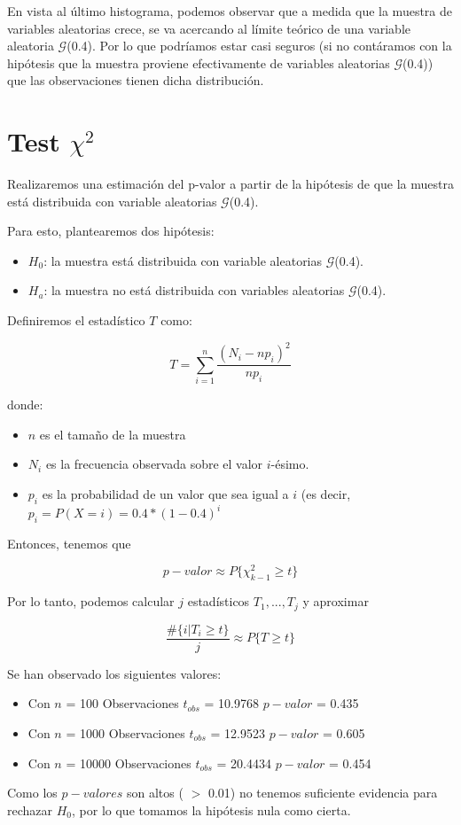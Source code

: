 \documentclass[a4paper,10pt]{article}
\begin{document}
En vista al último histograma, podemos observar que a medida que la muestra de variables aleatorias
crece, se va acercando al límite teórico de una variable aleatoria $\mathcal{G}$(0.4).
Por lo que podríamos estar casi seguros (si no contáramos con la hipótesis que la muestra proviene
efectivamente de variables aleatorias $\mathcal{G}$(0.4)) que las observaciones tienen
dicha distribución.

\pagebreak

\section*{Test $\chi^2$}

\vspace{0.4in}

Realizaremos una estimación del p-valor a partir de la hipótesis de que la muestra está distribuida
con variable aleatorias $\mathcal{G}$(0.4).

Para esto, plantearemos dos hipótesis:

\begin{itemize}
 \item $H_0$: la muestra está distribuida con variable aleatorias $\mathcal{G}$(0.4).
 \item $H_a$: la muestra no está distribuida con variables aleatorias $\mathcal{G}$(0.4).
\end{itemize}

Definiremos el estadístico $T$ como:

\[T = \sum\limits_{i=1}^n \frac{(N_i - n p_i)^2}{n p_i}\]

donde:

\begin{itemize}
 \item $n$ es el tamaño de la muestra
 \item $N_i$ es la frecuencia observada sobre el valor $i$-ésimo.
 \item $p_i$ es la probabilidad de un valor que sea igual a $i$ (es decir, $p_i = P(X=i) = 0.4*(1 - 0.4)^i$
\end{itemize}

Entonces, tenemos que

\[p-valor \approx P\{\chi^2_{k-1} \geq t\}\]

Por lo tanto, podemos calcular $j$ estadísticos $T_1,...,T_j$
y aproximar

\[\frac{\#\{i | T_i \geq t\}}{j} \approx P\{T \geq t\}\]

Se han observado los siguientes valores:

\begin{itemize}
 \item Con $n$ = 100 Observaciones
 \subitem $t_{obs}$ = 10.9768
 \subitem $p-valor$ = 0.435
 \item Con $n$ = 1000 Observaciones
 \subitem $t_{obs}$ = 12.9523
 \subitem $p-valor$ = 0.605
 \item Con $n$ = 10000 Observaciones
 \subitem $t_{obs}$ = 20.4434
 \subitem $p-valor$ = 0.454
\end{itemize}

Como los $p-valores$ son altos ( $>$ 0.01) no tenemos suficiente evidencia para rechazar $H_0$, por lo que
tomamos la hipótesis nula como cierta.
\end{document}

